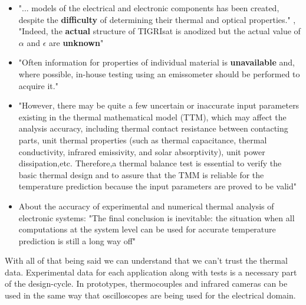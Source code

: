 \documentclass[final]{cubedoc}
\begin{document}
	\begin{itemize}
		\item "... models of the electrical and electronic components has been created, despite the \textbf{difficulty} of determining their thermal and optical properties." \cite{paris2015}, "Indeed, the \textbf{actual} structure of TIGRIsat is anodized but the actual value of $\alpha$  and $\epsilon$ are \textbf{unknown}" \cite{paris2015}
		\item "Often information for properties of individual material is \textbf{unavailable} and, where possible, in-house testing using an emissometer should be performed to acquire it." \cite{mccarron2018developing}
		
		
		\item "However, there may be quite a few uncertain or inaccurate input parameters existing in the thermal mathematical model (TTM), which may affect the analysis accuracy, including thermal contact resistance between contacting parts, unit thermal properties (such as thermal capacitance, thermal conductivity, infrared emissivity, and solar absorptivity), unit power dissipation,etc. Therefore,a thermal balance test is essential to verify the basic thermal design and to assure that the TMM is reliable for the temperature prediction because the input parameters are proved to be valid" \cite{tsai2004overview}
		
		
		
		\item About the accuracy of experimental and numerical thermal analysis of electronic systems: "The final conclusion is inevitable: the situation when all computations at the system level can be used for accurate temperature prediction is still a long way off" \cite{lasance2002}
	\end{itemize}
	
	With all of that being said we can understand that we can't trust the thermal data. Experimental data for each application along with tests is a necessary part of the design-cycle. In prototypes, thermocouples and infrared cameras can be used in the same way that oscilloscopes are being used for the electrical domain.
	
\end{document}
